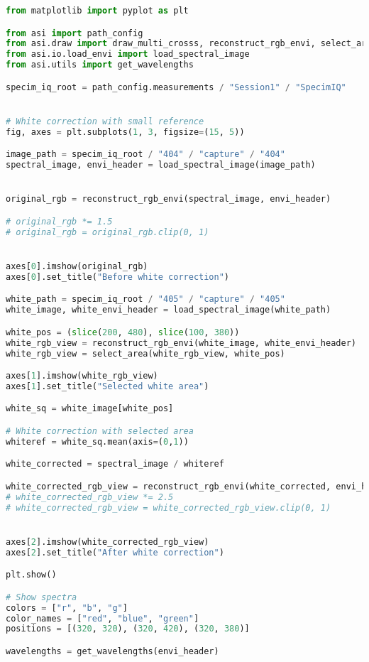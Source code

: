 \begin{lstlisting}[language=python, caption=White correction for SpecimIQ with large reference, label={code:wc-specimiq-large}]
from matplotlib import pyplot as plt

from asi import path_config
from asi.draw import draw_multi_crosss, reconstruct_rgb_envi, select_area
from asi.io.load_envi import load_spectral_image
from asi.utils import get_wavelengths

specim_iq_root = path_config.measurements / "Session1" / "SpecimIQ"


# White correction with small reference
fig, axes = plt.subplots(1, 3, figsize=(15, 5))

image_path = specim_iq_root / "404" / "capture" / "404"
spectral_image, envi_header = load_spectral_image(image_path)


original_rgb = reconstruct_rgb_envi(spectral_image, envi_header)

# original_rgb *= 1.5
# original_rgb = original_rgb.clip(0, 1)


axes[0].imshow(original_rgb)
axes[0].set_title("Before white correction")

white_path = specim_iq_root / "405" / "capture" / "405"
white_image, white_envi_header = load_spectral_image(white_path)

white_pos = (slice(200, 480), slice(100, 380))
white_rgb_view = reconstruct_rgb_envi(white_image, white_envi_header)
white_rgb_view = select_area(white_rgb_view, white_pos)

axes[1].imshow(white_rgb_view)
axes[1].set_title("Selected white area")

white_sq = white_image[white_pos]

# White correction with selected area
whiteref = white_sq.mean(axis=(0,1))

white_corrected = spectral_image / whiteref

white_corrected_rgb_view = reconstruct_rgb_envi(white_corrected, envi_header)
# white_corrected_rgb_view *= 2.5
# white_corrected_rgb_view = white_corrected_rgb_view.clip(0, 1)


axes[2].imshow(white_corrected_rgb_view)
axes[2].set_title("After white correction")

plt.show()

# Show spectra
colors = ["r", "b", "g"]
color_names = ["red", "blue", "green"]
positions = [(320, 320), (320, 420), (320, 380)]

wavelengths = get_wavelengths(envi_header)



\end{lstlisting}
